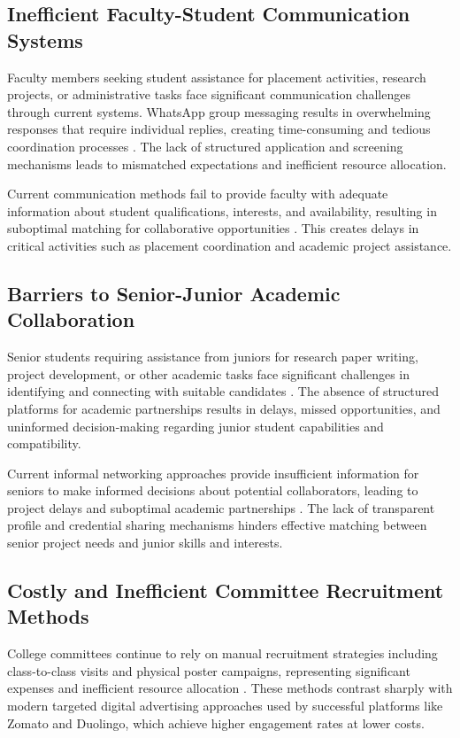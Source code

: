 \documentclass[conference]{IEEEtran}
\begin{document}
\subsection{Inefficient Faculty-Student Communication Systems}

Faculty members seeking student assistance for placement activities, research projects, or administrative tasks face significant communication challenges through current systems. WhatsApp group messaging results in overwhelming responses that require individual replies, creating time-consuming and tedious coordination processes \cite{ref14}\cite{ref15}. The lack of structured application and screening mechanisms leads to mismatched expectations and inefficient resource allocation.

Current communication methods fail to provide faculty with adequate information about student qualifications, interests, and availability, resulting in suboptimal matching for collaborative opportunities \cite{ref16}\cite{ref17}. This creates delays in critical activities such as placement coordination and academic project assistance.

\subsection{Barriers to Senior-Junior Academic Collaboration}

Senior students requiring assistance from juniors for research paper writing, project development, or other academic tasks face significant challenges in identifying and connecting with suitable candidates \cite{ref1}\cite{ref2}. The absence of structured platforms for academic partnerships results in delays, missed opportunities, and uninformed decision-making regarding junior student capabilities and compatibility.

Current informal networking approaches provide insufficient information for seniors to make informed decisions about potential collaborators, leading to project delays and suboptimal academic partnerships \cite{ref3}. The lack of transparent profile and credential sharing mechanisms hinders effective matching between senior project needs and junior skills and interests.

\subsection{Costly and Inefficient Committee Recruitment Methods}

College committees continue to rely on manual recruitment strategies including class-to-class visits and physical poster campaigns, representing significant expenses and inefficient resource allocation \cite{ref4}. These methods contrast sharply with modern targeted digital advertising approaches used by successful platforms like Zomato and Duolingo, which achieve higher engagement rates at lower costs.
\end{document}

